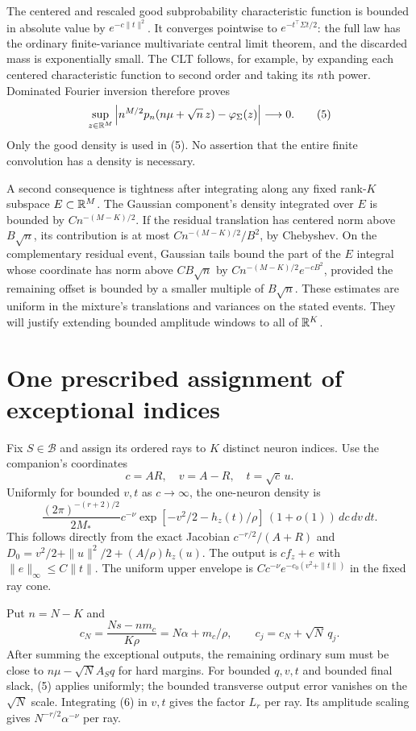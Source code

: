 \documentclass[11pt]{article}
\begin{document}
The centered and rescaled good subprobability characteristic function
is bounded in absolute value by $e^{-c\|t\|^2}$. It converges pointwise
to $e^{-t^\top\Sigma t/2}$: the full law has the ordinary finite-variance
multivariate central limit theorem, and the discarded mass is
exponentially small. The CLT follows, for example, by expanding each
centered characteristic function to second order and taking its $n$th
power. Dominated Fourier inversion therefore proves
\[
 \sup_{z\in\mathbb R^M}
 \left|n^{M/2}p_n(n\mu+\sqrt n\,z)-\varphi_\Sigma(z)\right|
                 \longrightarrow0.\tag{5}
\]
Only the good density is used in (5). No assertion that the entire
finite convolution has a density is necessary.

A second consequence is tightness after integrating along any fixed
rank-$K$ subspace $E\subset\mathbb R^M$. The Gaussian component's density
integrated over $E$ is bounded by $Cn^{-(M-K)/2}$. If the residual
translation has centered norm above $B\sqrt n$, its contribution is
at most $Cn^{-(M-K)/2}/B^2$, by Chebyshev. On the complementary
residual event, Gaussian tails bound the part of the $E$ integral whose
coordinate has norm above $CB\sqrt n$ by
$Cn^{-(M-K)/2}e^{-cB^2}$, provided the remaining offset is bounded by
a smaller multiple of $B\sqrt n$.
These estimates are uniform in the mixture's translations and variances
on the stated events. They will justify extending bounded amplitude
windows to all of $\mathbb R^K$.

\section{One prescribed assignment of exceptional indices}
Fix $S\in\mathcal B$ and assign its ordered rays to $K$ distinct
neuron indices. Use the companion's coordinates
\[
 c=AR,\quad v=A-R,\quad t=\sqrt c\,u.
\]
Uniformly for bounded $v,t$ as $c\to\infty$, the one-neuron density is
\[
 \frac{(2\pi)^{-(r+2)/2}}{2M_*}
 c^{-\nu}\exp[-v^2/2-h_z(t)/\rho]\,(1+o(1))\,dc\,dv\,dt.
 \tag{6}
\]
This follows directly from the exact Jacobian
$c^{-r/2}/(A+R)$ and
$D_0=v^2/2+\|u\|^2/2+(A/\rho)h_z(u)$.
The output is $cf_z+e$ with $\|e\|_\infty\le C\|t\|$.
The uniform upper envelope is
$Cc^{-\nu}e^{-c_0(v^2+\|t\|)}$ in the fixed ray cone.

Put $n=N-K$ and
\[
 c_N=\frac{Ns-nm_c}{K\rho}=N\alpha+m_c/\rho,
 \qquad c_j=c_N+\sqrt N\,q_j.
\]
After summing the exceptional outputs, the remaining ordinary sum must
be close to $n\mu-\sqrt N A_Sq$ for hard margins. For bounded $q,v,t$
and bounded final slack, (5) applies uniformly; the bounded transverse
output error vanishes on the $\sqrt N$ scale.
Integrating (6) in $v,t$ gives the factor $L_r$ per ray. Its amplitude
scaling gives $N^{-r/2}\alpha^{-\nu}$ per ray.
\end{document}
